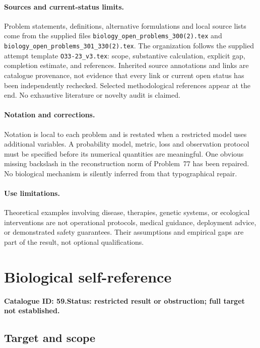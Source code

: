 \documentclass[11pt]{article}
\begin{document}
\paragraph{Sources and current-status limits.}
Problem statements, definitions, alternative formulations and local source lists
come from the supplied files
\texttt{biology\_open\_problems\_300(2).tex} and
\texttt{biology\_open\_problems\_301\_330(2).tex}.
The organization follows the supplied attempt template
\texttt{O33-23\_v3.tex}: scope, substantive calculation, explicit gap,
completion estimate, and references. Inherited source annotations and links are
catalogue provenance, not evidence that every link or current open status has
been independently rechecked. Selected methodological references appear at the
end. No exhaustive literature or novelty audit is claimed.

\paragraph{Notation and corrections.}
Notation is local to each problem and is restated when a restricted model uses
additional variables. A probability model, metric, loss and observation protocol
must be specified before its numerical quantities are meaningful. One obvious
missing backslash in the reconstruction norm of Problem~77 has been repaired.
No biological mechanism is silently inferred from that typographical repair.

\paragraph{Use limitations.}
Theoretical examples involving disease, therapies, genetic systems, or ecological
interventions are not operational protocols, medical guidance, deployment advice,
or demonstrated safety guarantees. Their assumptions and empirical gaps are part
of the result, not optional qualifications.

\setcounter{section}{58}
\section{Biological self-reference}
\label{prob:059}
\noindent\textbf{Catalogue ID: 59.}\quad \textbf{Status: restricted result or obstruction; full target not established.}
\subsection{Target and scope}
\end{document}
